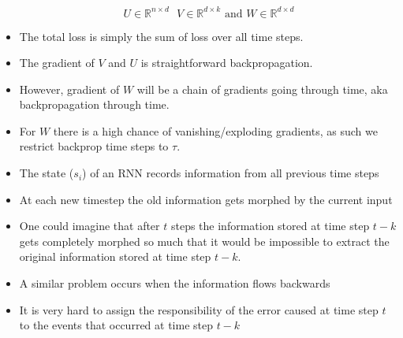 \documentclass[a4paper]{article}
\begin{document}
\begin{itemize}
    \begin{equation*}
        U\in \mathbb{R}^{n\times d}\text{  }V\in \mathbb{R}^{d\times k}\text{ and }W\in \mathbb{R}^{d\times d}
    \end{equation*}
    \item The total loss is simply the sum of loss over all time steps.
    \item The gradient of $V$ and $U$ is straightforward backpropagation.
    \item However, gradient of $W$ will be a chain of gradients going through time, aka backpropagation through time.
    \item For $W$ there is a high chance of vanishing/exploding gradients, as such we restrict backprop time steps to $\tau$.
    \item The state ($s_i$) of an RNN records information from all previous time steps
    \item At each new timestep the old information gets morphed by the current input
    \item One could imagine that after $t$ steps the information stored at time step $t-k$ gets completely morphed so much that it would be impossible to extract the original information stored at time step $t - k$.
    \item A similar problem occurs when the information flows backwards
    \item It is very hard to assign the responsibility of the error caused at time step $t$ to the events that occurred at time step $t - k$
\end{itemize}
\end{document}
